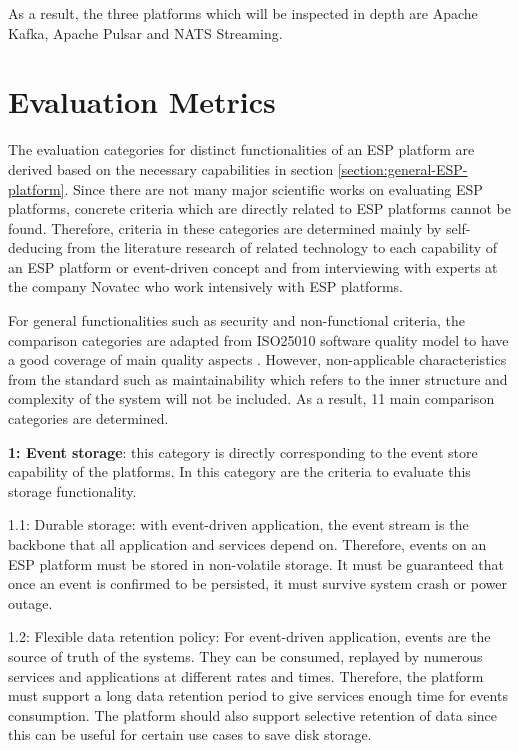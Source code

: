 As a result, the three platforms which will be inspected in depth are Apache Kafka, Apache Pulsar and NATS Streaming.

\section{Evaluation Metrics} \label{section:evaluationcriteria}
The evaluation categories for distinct functionalities of an ESP platform are derived based on the necessary capabilities in section \ref{section:general-ESP-platform}. Since there are not many major scientific works on evaluating ESP platforms, concrete criteria which are directly related to ESP platforms cannot be found. Therefore, criteria in these categories are determined mainly by self-deducing from the literature research of related technology to each capability of an ESP platform or event-driven concept and from interviewing with experts at the company Novatec who work intensively with ESP platforms.

For general functionalities such as security and non-functional criteria, the comparison categories are adapted from ISO25010 software quality model to have a good coverage of main quality aspects \cite{iso25010}. However, non-applicable characteristics from the standard such as maintainability which refers to the inner structure and complexity of the system will not be included. As a result, 11 main comparison categories are determined. 


\textbf{1: Event storage}: this category is directly corresponding to the event store capability of the platforms. In this category are the criteria to evaluate this storage functionality.

1.1: Durable storage: with event-driven application, the event stream is the backbone that all application and services depend on. Therefore, events on an ESP platform must be stored in non-volatile storage. It must be guaranteed that once an event is confirmed to be persisted, it must survive system crash or power outage.

1.2: Flexible data retention policy: For event-driven application, events are the source of truth of the systems. They can be consumed, replayed by numerous services and applications at different rates and times. Therefore, the platform must support a long data retention period to give services enough time for events consumption. The platform should also support selective retention of data since this can be useful for certain use cases to save disk storage.

